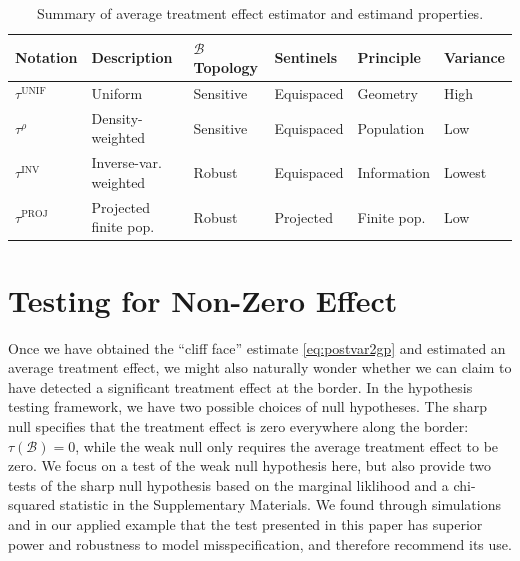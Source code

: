 \documentclass[letter,12pt]{article}
\newcommand{\border}{\mathcal{B}}
\newcommand{\unifavg}{\tau^{\mathrm{UNIF}}}
\newcommand{\invvar}{\tau^{\mathrm{INV}}}
\newcommand{\taurho}{\tau^{\rho}}
\newcommand{\tauproj}{\tau^{\mathrm{PROJ}}}
\newcommand{\taugeo}{\tau^{\mathrm{GEO}}}
\newcommand{\taupop}{\tau^{\mathrm{POP}}}
\begin{document}
\begin{table}[tbp]
    \centering
    \begin{tabular}{llllll}
        \hline
        Notation   & Description           & $\border$ Topology & Sentinels & Principle & Variance \\
        \hline
        $\unifavg$ & Uniform               & Sensitive & Equispaced      & Geometry    & High     \\
        $\taurho$  & Density-weighted      & Sensitive & Equispaced      & Population  & Low      \\
        $\invvar$  & Inverse-var. weighted & Robust    & Equispaced      & Information & Lowest   \\
        $\tauproj$ & Projected finite pop. & Robust    & Projected       & Finite pop. & Low      \\
        \hline
    \end{tabular}
    \caption{
    \label{table:estimator_properties}
    Summary of average treatment effect estimator and estimand properties.}
\end{table}
\hypertarget{testing-for-non-zero-effect}{%
\section{Testing for Non-Zero Effect}\label{testing-for-non-zero-effect}}


\label{sec:hypothesis_testing}
Once we have obtained the ``cliff face'' estimate \eqref{eq:postvar2gp} and estimated an average treatment effect, we might also naturally wonder whether we can claim to have detected a significant treatment effect at the border.
In the hypothesis testing framework, we have two possible choices of null hypotheses.
The sharp null specifies that the treatment effect is zero everywhere along the border:
\(\tau(\border)=0\),
while the weak null only requires the average treatment effect to be zero.
We focus on a test of the weak null hypothesis here, but also provide two tests of the sharp null hypothesis based on the marginal liklihood and a chi-squared statistic in the Supplementary Materials.
We found through simulations and in our applied example that the test presented in this paper has superior power and robustness to model misspecification, and therefore recommend its use.
\end{document}
